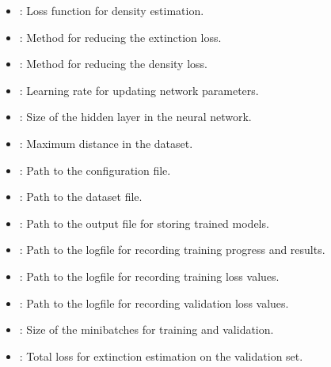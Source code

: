 \documentclass[letterpaper,10pt,english]{sphinxmanual}
\begin{document}
\begin{fulllineitems}
\begin{description}
\begin{itemize}
\item {} 
\sphinxAtStartPar
{}: Loss function for density estimation.

\item {} 
\sphinxAtStartPar
{}: Method for reducing the extinction loss.

\item {} 
\sphinxAtStartPar
{}: Method for reducing the density loss.

\item {} 
\sphinxAtStartPar
{}: Learning rate for updating network parameters.

\item {} 
\sphinxAtStartPar
{}: Size of the hidden layer in the neural network.

\item {} 
\sphinxAtStartPar
{}: Maximum distance in the dataset.

\item {} 
\sphinxAtStartPar
{}: Path to the configuration file.

\item {} 
\sphinxAtStartPar
{}: Path to the dataset file.

\item {} 
\sphinxAtStartPar
{}: Path to the output file for storing trained models.

\item {} 
\sphinxAtStartPar
{}: Path to the logfile for recording training progress and results.

\item {} 
\sphinxAtStartPar
{}: Path to the logfile for recording training loss values.

\item {} 
\sphinxAtStartPar
{}: Path to the logfile for recording validation loss values.

\item {} 
\sphinxAtStartPar
{}: Size of the minibatches for training and validation.

\item {} 
\sphinxAtStartPar
{}: Total loss for extinction estimation on the validation set.


\end{itemize}
\end{description}
\end{fulllineitems}
\end{document}
